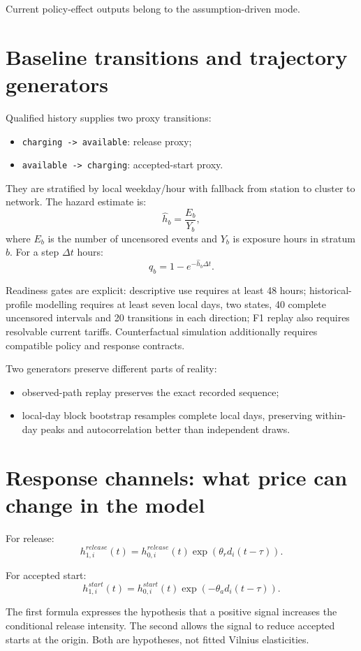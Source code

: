 \documentclass[11pt,a4paper]{article}
\newcommand{\code}[1]{\texttt{#1}}
\begin{document}
Current policy-effect outputs belong to the assumption-driven mode.

\section{Baseline transitions and trajectory generators}

Qualified history supplies two proxy transitions:
\begin{itemize}
\item \code{charging -> available}: release proxy;
\item \code{available -> charging}: accepted-start proxy.
\end{itemize}

They are stratified by local weekday/hour with fallback from station to cluster to network. The hazard estimate is:
\[
\widehat h_b=\frac{E_b}{Y_b},
\]
where $E_b$ is the number of uncensored events and $Y_b$ is exposure hours in stratum $b$. For a step $\Delta t$ hours:
\[
q_b=1-e^{-\widehat h_b\Delta t}.
\]

Readiness gates are explicit: descriptive use requires at least 48 hours; historical-profile modelling requires at least seven local days, two states, 40 complete uncensored intervals and 20 transitions in each direction; F1 replay also requires resolvable current tariffs. Counterfactual simulation additionally requires compatible policy and response contracts.

Two generators preserve different parts of reality:
\begin{itemize}
\item observed-path replay preserves the exact recorded sequence;
\item local-day block bootstrap resamples complete local days, preserving within-day peaks and autocorrelation better than independent draws.
\end{itemize}

\section{Response channels: what price can change in the model}

For release:
\[
h^{release}_{1,i}(t)
=h^{release}_{0,i}(t)
\exp\!\left(\theta_r d_i(t-\tau)\right).
\]

For accepted start:
\[
h^{start}_{1,i}(t)
=h^{start}_{0,i}(t)
\exp\!\left(-\theta_a d_i(t-\tau)\right).
\]

The first formula expresses the hypothesis that a positive signal increases the conditional release intensity. The second allows the signal to reduce accepted starts at the origin. Both are hypotheses, not fitted Vilnius elasticities.
\end{document}
